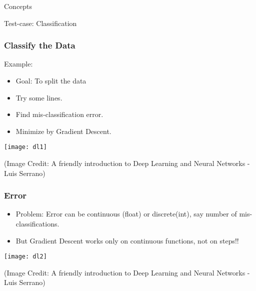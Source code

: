 \begin{frame}
  \begin{center}
    {\Large Concepts}

  \end{center}
\end{frame}

\begin{frame}
  \begin{center}
    {\Large Test-case: Classification}

  \end{center}
\end{frame}

\begin{frame}[fragile] \frametitle{Classify the Data}
Example:
\begin{itemize}
\item Goal: To split the data
\item Try some lines. 
\item Find mis-classification error. 
\item Minimize by Gradient Descent.
\end{itemize}
\begin{center}
\texttt{[image: dl1]}
\end{center}
{\tiny (Image Credit: A friendly introduction to Deep Learning and Neural Networks -  Luis Serrano)}

\end{frame}

\begin{frame}[fragile] \frametitle{Error}
\begin{itemize}
\item Problem: Error can be continuous (float) or discrete(int), say number of mis-classifications.
\item But Gradient Descent works only on continuous functions, not on steps!!
\end{itemize}
\begin{center}
\texttt{[image: dl2]}
\end{center}
{\tiny (Image Credit: A friendly introduction to Deep Learning and Neural Networks -  Luis Serrano)}
\end{frame}


